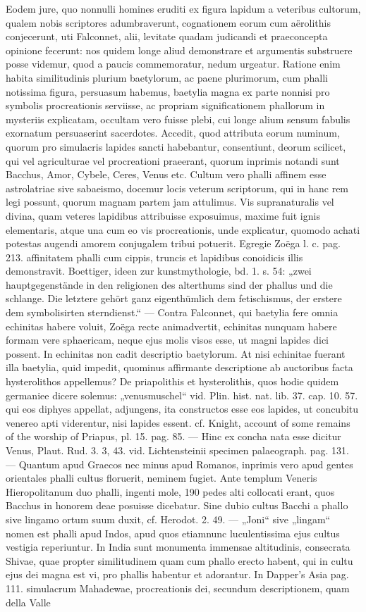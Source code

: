 \documentclass[a4paper, 11pt, oneside, polutonikogreek, german]{article}
\begin{document}
Eodem jure, quo nonnulli homines eruditi ex figura lapidum a veteribus cultorum, qualem nobis scriptores adumbraverunt, cognationem eorum cum aërolithis conjecerunt, uti Falconnet, alii, levitate quadam judicandi et praeconcepta opinione fecerunt: nos quidem longe aliud demonstrare et argumentis substruere posse videmur, quod a paucis commemoratur, nedum urgeatur. Ratione enim habita similitudinis plurium baetylorum, ac paene plurimorum, cum phalli notissima figura, persuasum habemus, baetylia magna ex parte nonnisi pro symbolis procreationis serviisse, ac propriam significationem phallorum in mysteriis explicatam, occultam vero fuisse plebi, cui longe alium sensum fabulis exornatum persuaserint sacerdotes. Accedit, quod attributa eorum numinum, quorum pro simulacris lapides sancti habebantur, consentiunt, deorum scilicet, qui vel agriculturae vel procreationi praeerant, quorum inprimis notandi sunt Bacchus, Amor, Cybele, Ceres, Venus etc. Cultum vero phalli affinem esse astrolatriae sive sabaeismo, docemur locis veterum scriptorum, qui in hanc rem legi possunt, quorum magnam partem jam attulimus. Vis supranaturalis vel divina, quam veteres lapidibus attribuisse exposuimus, maxime fuit ignis elementaris, atque una cum eo vis procreationis, unde explicatur, quomodo achati potestas augendi amorem conjugalem tribui potuerit. Egregie Zoëga l. c. pag. 213. affinitatem phalli cum cippis, truncis et lapidibus conoidicis illis demonstravit. Boettiger, ideen zur kunstmythologie, bd. 1. s. 54: „zwei hauptgegenstände in den religionen des alterthums sind der phallus und die schlange. Die letztere gehört ganz eigenthümlich dem fetischismus, der erstere dem symbolisirten sterndienst.“ --- Contra Falconnet, qui baetylia fere omnia echinitas habere voluit, Zoëga recte animadvertit, echinitas nunquam habere formam vere sphaericam, neque ejus molis visos esse, ut magni lapides dici possent. In echinitas non cadit descriptio baetylorum. At nisi echinitae fuerant illa baetylia, quid impedit, quominus affirmante descriptione ab auctoribus facta hysterolithos appellemus? De priapolithis et hysterolithis, quos hodie quidem germaniee dicere solemus: „venusmuschel“ vid. Plin. hist. nat. lib. 37. cap. 10. 57. qui eos diphyes appellat, adjungens, ita constructos esse eos lapides, ut concubitu venereo apti viderentur, nisi lapides essent. cf. Knight, account of some remains of the worship of Priapus, pl. 15. pag. 85. --- Hinc ex concha nata esse dicitur Venus, Plaut. Rud. 3. 3, 43. vid. Lichtensteinii specimen palaeograph. pag. 131. --- Quantum apud Graecos nec minus apud Romanos, inprimis vero apud gentes orientales phalli cultus floruerit, neminem fugiet. Ante templum Veneris Hieropolitanum duo phalli, ingenti mole, 190 pedes alti collocati erant, quos Bacchus in honorem deae posuisse dicebatur. Sine dubio cultus Bacchi a phallo sive lingamo ortum suum duxit, cf. Herodot. 2. 49. --- „Joni“ sive „lingam“ nomen est phalli apud Indos, apud quos etiamnunc luculentissima ejus cultus vestigia reperiuntur. In India sunt monumenta immensae altitudinis, consecrata Shivae, quae propter similitudinem quam cum phallo erecto habent, qui in cultu ejus dei magna est vi, pro phallis habentur et adorantur. In Dapper's Asia pag. 111. simulacrum Mahadewae, procreationis dei, secundum descriptionem, quam della Valle 
\end{document}

